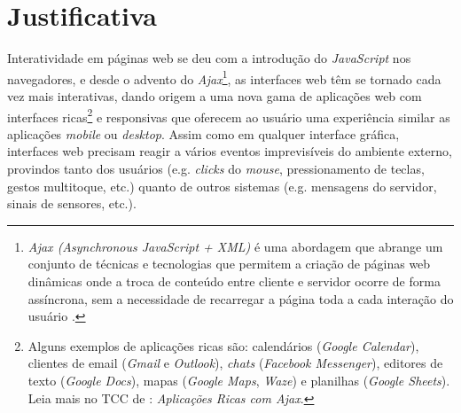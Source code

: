 \section{Justificativa}\label{ljustificativa}

Interatividade em páginas web se deu com a
introdução do \emph{JavaScript} nos navegadores,
e desde o advento do \emph{Ajax}\footnote{
  \emph{Ajax (Asynchronous JavaScript + XML)} é uma
  abordagem que abrange um conjunto de técnicas e
  tecnologias que permitem a criação de páginas web
  dinâmicas onde a troca de conteúdo entre cliente e
  servidor ocorre de forma assíncrona, sem a necessidade
  de recarregar a página toda a cada interação do
  usuário \cite{garrett2005ajax}.
},
as interfaces web têm se tornado cada vez mais interativas,
dando origem a uma nova gama de aplicações web com interfaces
ricas\footnote{
  Alguns exemplos de aplicações ricas são:
  calendários (\emph{Google Calendar}),
  clientes de email (\emph{Gmail} e \emph{Outlook}),
  \emph{chats} (\emph{Facebook Messenger}),
  editores de texto (\emph{Google Docs}),
  mapas (\emph{Google Maps}, \emph{Waze}) e
  planilhas (\emph{Google Sheets}).
  Leia mais no TCC de :
  \emph{Aplicações Ricas com Ajax}.
} e responsivas que oferecem ao usuário uma experiência
similar as aplicações \emph{mobile} ou \emph{desktop}.
Assim como em qualquer interface gráfica, interfaces web
precisam reagir a vários eventos imprevisíveis do ambiente
externo, provindos tanto dos usuários (e.g. \emph{clicks}
do \emph{mouse}, pressionamento de teclas, gestos multitoque,
etc.) quanto de outros sistemas (e.g. mensagens do servidor,
sinais de sensores, etc.).

